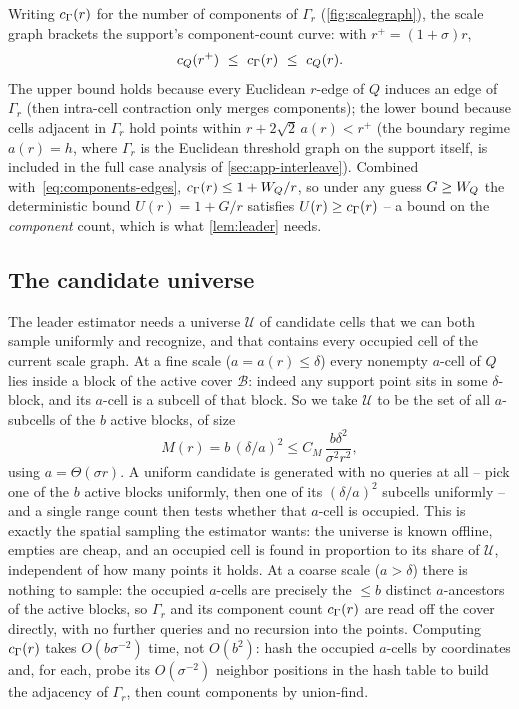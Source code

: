 Writing $c_\Gamma(r)$ for the number of components of $\Gamma_r$ (\cref{fig:scalegraph}), the scale graph
brackets the support's component-count curve: with $r^+=(1+\sigma)r$,
\begin{equation}\label{eq:interleave}
  c_Q(r^+)\ \le\ c_\Gamma(r)\ \le\ c_Q(r).
\end{equation}
The upper bound holds because every Euclidean $r$-edge of $Q$ induces an edge of $\Gamma_r$ (then
intra-cell contraction only merges components); the lower bound because cells adjacent in $\Gamma_r$ hold
points within $r+2\sqrt2\,a(r)<r^+$ (the boundary regime $a(r)=h$, where $\Gamma_r$ is the Euclidean
threshold graph on the support itself, is included in the full case analysis of \cref{sec:app-interleave}).
Combined with~\eqref{eq:components-edges}, $c_\Gamma(r)\le 1+W_Q/r$, so
under any guess $G\ge W_Q$ the deterministic bound $U(r)=1+G/r$ satisfies $U(r)\ge c_\Gamma(r)$ -- a bound on the
\emph{component} count, which is what \cref{lem:leader} needs.

\subsection{The candidate universe}\label{sec:support-cand}

The leader estimator needs a universe $\mathcal U$ of candidate cells that we can both sample uniformly
and recognize, and that contains every occupied cell of the current scale graph. At a fine scale
($a=a(r)\le\delta$) every nonempty $a$-cell of $Q$ lies inside a block of the active cover $\mathcal B$:
indeed any support point sits in some $\delta$-block, and its $a$-cell is a subcell of that block. So we
take $\mathcal U$ to be the set of all $a$-subcells of the $b$ active blocks, of size
\begin{equation}\label{eq:Msize}
  M(r)=b\,(\delta/a)^2\le C_M\,\frac{b\delta^2}{\sigma^2 r^2},
\end{equation}
using $a=\Theta(\sigma r)$. A uniform candidate is generated with no queries at all -- pick one of the $b$
active blocks uniformly, then one of its $(\delta/a)^2$ subcells uniformly -- and a single range count
then tests whether that $a$-cell is occupied. This is exactly the spatial sampling the estimator wants:
the universe is known offline, empties are cheap, and an occupied cell is found in proportion to its share
of $\mathcal U$, independent of how many points it holds. At a coarse scale ($a>\delta$) there is nothing
to sample: the occupied $a$-cells are precisely the $\le b$ distinct $a$-ancestors of the active blocks,
so $\Gamma_r$ and its component count $c_\Gamma(r)$ are read off the cover directly, with no further queries and
no recursion into the points. Computing $c_\Gamma(r)$ takes $O(b\sigma^{-2})$ time, not $O(b^2)$: hash the
occupied $a$-cells by coordinates and, for each, probe its $O(\sigma^{-2})$ neighbor positions in the
hash table to build the adjacency of $\Gamma_r$, then count components by union-find.

